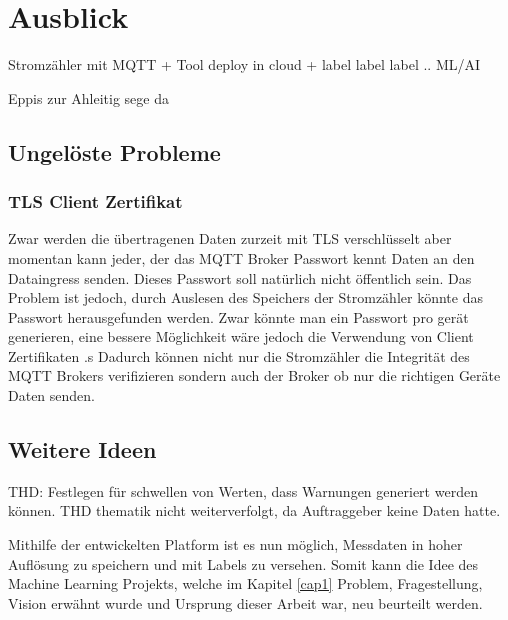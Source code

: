 \chapter{Ausblick}

Stromzähler mit MQTT + Tool deploy in cloud + label label label
..
ML/AI

Eppis zur Ahleitig sege da



\section{Ungelöste Probleme}

\subsection{\ac{TLS} Client Zertifikat}

Zwar werden die übertragenen Daten zurzeit mit \ac{TLS} verschlüsselt aber
momentan kann jeder, der das \ac{MQTT} Broker Passwort kennt Daten an den
Dataingress senden. Dieses Passwort soll natürlich nicht öffentlich sein.
Das Problem ist jedoch, durch Auslesen des Speichers der Stromzähler
könnte das Passwort herausgefunden werden.
Zwar könnte man ein Passwort pro gerät generieren, eine bessere Möglichkeit
wäre jedoch die Verwendung von Client Zertifikaten \parencite{rfc5246_2021}.s
Dadurch können nicht nur die Stromzähler die Integrität des \ac{MQTT} Brokers
verifizieren sondern auch der Broker ob nur die richtigen Geräte
Daten senden.



\section{Weitere Ideen}
THD: Festlegen für schwellen von Werten, dass Warnungen generiert werden können.
THD thematik nicht weiterverfolgt, da Auftraggeber keine Daten hatte.

Mithilfe der entwickelten Platform ist es nun möglich, Messdaten in hoher Auflösung zu speichern
und mit Labels zu versehen.
Somit kann die Idee des Machine Learning Projekts, welche im Kapitel \ref{cap1} Problem, Fragestellung, Vision erwähnt wurde und Ursprung dieser
Arbeit war, neu beurteilt werden.


